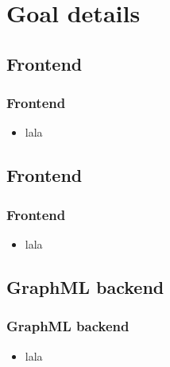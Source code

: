 \documentclass{beamer}
\begin{document}
\section{Goal details}

\beamerdefaultoverlayspecification{<+->}

\subsection{Frontend}

\begin{frame}[fragile]
  \frametitle{Frontend}
  \begin{itemize}
  \item lala
  \end{itemize}
  
\end{frame}



\subsection{Frontend}

\begin{frame}[fragile]
  \frametitle{Frontend}
  \begin{itemize}
  \item lala
  \end{itemize}
  
\end{frame}


\subsection{GraphML backend}

\begin{frame}[fragile]
  \frametitle{GraphML backend}
  \begin{itemize}
  \item lala
  \end{itemize}
  
\end{frame}
\end{document}
